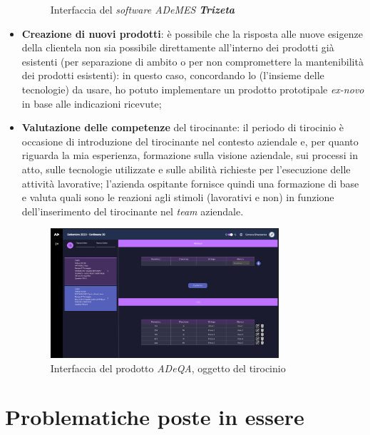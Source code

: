 \begin{itemize}
\begin{figure}[H]
            \vspace{-20mm}
            \caption[Interfaccia del \textit{software ADeMES}]{Interfaccia del \textit{software ADeMES} \textit{\textbf{Trizeta}}\footnotemark}
        \end{figure}
    \item \textbf{Creazione di nuovi prodotti}: è possibile che la risposta alle nuove esigenze della clientela non sia possibile direttamente all'interno dei prodotti già esistenti (per separazione di ambito o
        per non compromettere la mantenibilità dei prodotti esistenti): in questo caso, concordando lo  (l'insieme delle tecnologie) da usare, ho potuto implementare un prodotto prototipale \textit{ex-novo} in base alle indicazioni ricevute;
    \item \textbf{Valutazione delle competenze} del tirocinante: il periodo di tirocinio è occasione di introduzione del tirocinante nel contesto aziendale e, per quanto riguarda la mia esperienza, formazione sulla visione aziendale, sui processi in atto, sulle tecnologie utilizzate
        e sulle abilità richieste per l'esecuzione delle attività lavorative; l'azienda ospitante fornisce quindi una formazione di base e valuta quali sono le reazioni agli stimoli (lavorativi e non) in funzione dell'inserimento del tirocinante nel \textit{team} aziendale.
        \begin{figure}[H]
            \centering
            \includegraphics[width=0.8\textwidth]{images/dashboard.png}
            \caption[Interfaccia del prodotto \textit{ADeQA}]{Interfaccia del prodotto \textit{ADeQA}, oggetto del tirocinio}
        \end{figure}
\end{itemize}
\section{Problematiche poste in essere}

